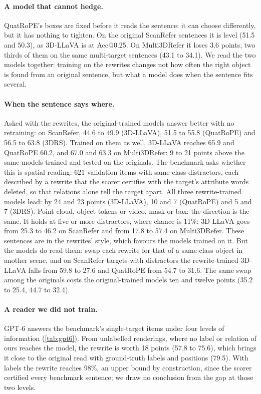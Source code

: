 \paragraph{A model that cannot hedge.}
QuatRoPE's boxes are fixed before it reads the sentence: it can choose differently, but it has nothing to tighten.
On the original ScanRefer sentences it is level (51.5 and 50.3), as 3D-LLaVA is at Acc@0.25.
On Multi3DRefer it loses 3.6 points, two thirds of them on the same multi-target sentences (43.1 to 34.1).
We read the two models together: training on the rewrites changes not how often the right object is found from an original sentence, but what a model does when the sentence fits several.

\paragraph{When the sentence says where.}
Asked with the rewrites, the original-trained models answer better with no retraining: on ScanRefer, 44.6 to 49.9 (3D-LLaVA), 51.5 to 55.8 (QuatRoPE) and 56.5 to 63.8 (3DRS).
Trained on them as well, 3D-LLaVA reaches 65.9 and QuatRoPE 60.2, and 67.0 and 63.3 on Multi3DRefer: 9 to 21 points above the same models trained and tested on the originals.
The benchmark asks whether this is spatial reading: 621 validation items with same-class distractors, each described by a rewrite that the scorer certifies with the target's attribute words deleted, so that relations alone tell the target apart.
All three rewrite-trained models lead: by 24 and 23 points (3D-LLaVA), 10 and 7 (QuatRoPE) and 5 and 7 (3DRS).
Point cloud, object tokens or video, mask or box: the direction is the same.
It holds at five or more distractors, where chance is 11\%: 3D-LLaVA goes from 25.3 to 46.2 on ScanRefer and from 17.8 to 57.4 on Multi3DRefer.
These sentences are in the rewrites' style, which favours the models trained on it.
But the models do read them: swap each rewrite for that of a same-class object in another scene, and on ScanRefer targets with distractors the rewrite-trained 3D-LLaVA falls from 59.8 to 27.6 and QuatRoPE from 54.7 to 31.6.
The same swap among the originals costs the original-trained models ten and twelve points (35.2 to 25.4, 44.7 to 32.4).


\paragraph{A reader we did not train.}
GPT-6 answers the benchmark's single-target items under four levels of information (\cref{tab:gpt6}).
From unlabelled renderings, where no label or relation of ours reaches the model, the rewrite is worth 18 points (57.8 to 75.6), which brings it close to the original read with ground-truth labels and positions (79.5).
With labels the rewrite reaches 98\%, an upper bound by construction, since the scorer certified every benchmark sentence; we draw no conclusion from the gap at those two levels.
